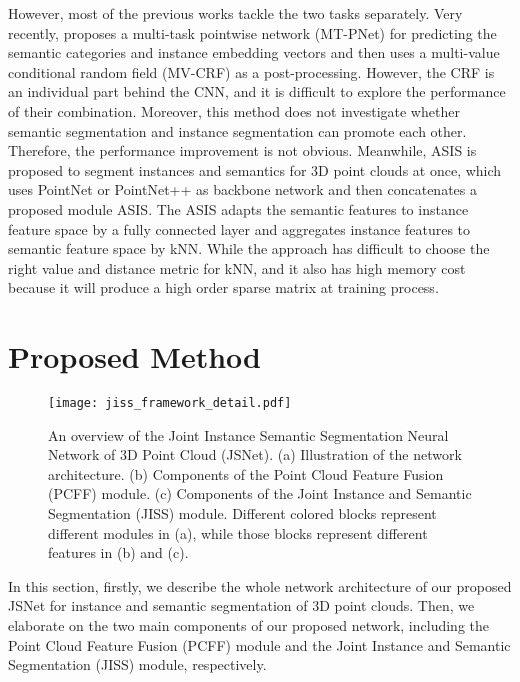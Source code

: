 \documentclass[letterpaper]{article} \usepackage{aaai20}  \usepackage{times}  \usepackage{helvet} \usepackage{courier}  \usepackage[hyphens]{url}  \usepackage{graphicx} \urlstyle{rm} \def\UrlFont{\rm}  \usepackage{graphicx}  \frenchspacing  \setlength{\pdfpagewidth}{8.5in}  \setlength{\pdfpageheight}{11in}
\begin{document}
However, most of the previous works tackle the two tasks separately. Very recently, \cite{Pham_2019_CVPR} proposes a multi-task pointwise network (MT-PNet) for predicting the semantic categories and instance embedding vectors and then uses a multi-value conditional random field (MV-CRF) as a post-processing. However, the CRF is an individual part behind the CNN, and it is difficult to explore the performance of their combination. Moreover, this method does not investigate whether semantic segmentation and instance segmentation can promote each other. Therefore, the performance improvement is not obvious. Meanwhile, ASIS \cite{Wang_2019_CVPR} is proposed to segment instances and semantics for 3D point clouds at once, which uses PointNet or PointNet++ as backbone network and then concatenates a proposed module ASIS. The ASIS adapts the semantic features to instance feature space by a fully connected layer and aggregates instance features to semantic feature space by kNN. While the approach \cite{Wang_2019_CVPR} has difficult to choose the right  value and distance metric for kNN, and it also has high memory cost because it will produce a high order sparse matrix at training process.

\section{Proposed Method}
\begin{figure*}[t]
	\centering
	\texttt{[image: jiss\_framework\_detail.pdf]}
	\caption{An overview of the Joint Instance Semantic Segmentation Neural Network of 3D Point Cloud (JSNet). (a) Illustration of the network architecture. (b) Components of the Point Cloud Feature Fusion (PCFF) module. (c) Components of the Joint Instance and Semantic Segmentation (JISS) module. Different colored blocks represent different modules in (a), while those blocks represent different features in (b) and (c).}
	\label{fig:network_framework_detail}
\end{figure*}

In this section, firstly, we describe the whole network architecture of our proposed JSNet for instance and semantic segmentation of 3D point clouds. Then, we elaborate on the two main components of our proposed network, including the Point Cloud Feature Fusion (PCFF) module and the Joint Instance and Semantic Segmentation (JISS) module, respectively. 
\end{document}

